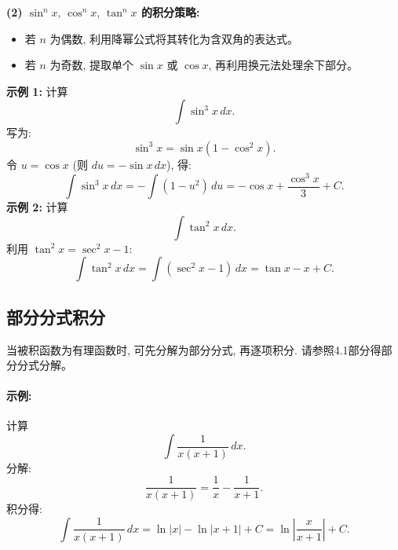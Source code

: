 \documentclass[8pt,a4paper,twoside]{tau-class/tau}
\begin{document}
\textbf{(2) \(\sin^n x,\,\cos^n x,\,\tan^n x\) 的积分策略:}
\begin{itemize}
    \item 若 \(n\) 为偶数, 利用降幂公式将其转化为含双角的表达式。
    \item 若 \(n\) 为奇数, 提取单个 \(\sin x\) 或 \(\cos x\), 再利用换元法处理余下部分。
\end{itemize}
\textbf{示例 1:} 计算 
\[
\int \sin^3 x\,dx.
\]
写为:
\[
\sin^3 x = \sin x (1−\cos^2 x).
\]
令 \(u=\cos x\) (则 \(du=−\sin x\,dx\)), 得:
\[
\int \sin^3 x\,dx = −\int (1−u^2)\,du = −\cos x + \frac{\cos^3 x}{3} + C.
\]
\textbf{示例 2:} 计算 
\[
\int \tan^2 x\,dx.
\]
利用 \(\tan^2 x = \sec^2 x − 1\):
\[
\int \tan^2 x\,dx = \int (\sec^2 x−1)\,dx = \tan x − x + C.
\]

\subsection{部分分式积分}
当被积函数为有理函数时, 可先分解为部分分式, 再逐项积分. 请参照4.1部分得部分分式分解。
\paragraph{示例:}计算 
\[
\int \frac{1}{x(x+1)}\,dx.
\]
分解:
\[
\frac{1}{x(x+1)} = \frac{1}{x} − \frac{1}{x+1}.
\]
积分得:
\[
\int \frac{1}{x(x+1)}\,dx = \ln|x| − \ln|x+1| + C = \ln\left|\frac{x}{x+1}\right| + C.
\]
\end{document}
